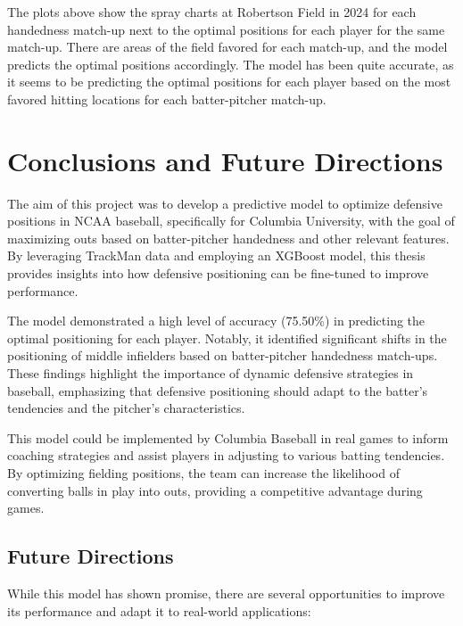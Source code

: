 \documentclass{article}
\begin{document}
The plots above show the spray charts at Robertson Field in 2024 for each handedness match-up next to the optimal positions for each player for the same match-up. There are areas of the field favored for each match-up, and the model predicts the optimal positions accordingly. The model has been quite accurate, as it seems to be predicting the optimal positions for each player based on the most favored hitting locations for each batter-pitcher match-up.  

\newpage
\section{Conclusions and Future Directions}

The aim of this project was to develop a predictive model to optimize defensive positions in NCAA baseball, specifically for Columbia University, with the goal of maximizing outs based on batter-pitcher handedness and other relevant features. By leveraging TrackMan data and employing an XGBoost model, this thesis provides insights into how defensive positioning can be fine-tuned to improve performance.

The model demonstrated a high level of accuracy (75.50\%) in predicting the optimal positioning for each player. Notably, it identified significant shifts in the positioning of middle infielders based on batter-pitcher handedness match-ups. These findings highlight the importance of dynamic defensive strategies in baseball, emphasizing that defensive positioning should adapt to the batter's tendencies and the pitcher's characteristics.

This model could be implemented by Columbia Baseball in real games to inform coaching strategies and assist players in adjusting to various batting tendencies. By optimizing fielding positions, the team can increase the likelihood of converting balls in play into outs, providing a competitive advantage during games.


\subsection{Future Directions}
While this model has shown promise, there are several opportunities to improve its performance and adapt it to real-world applications:
\end{document}
